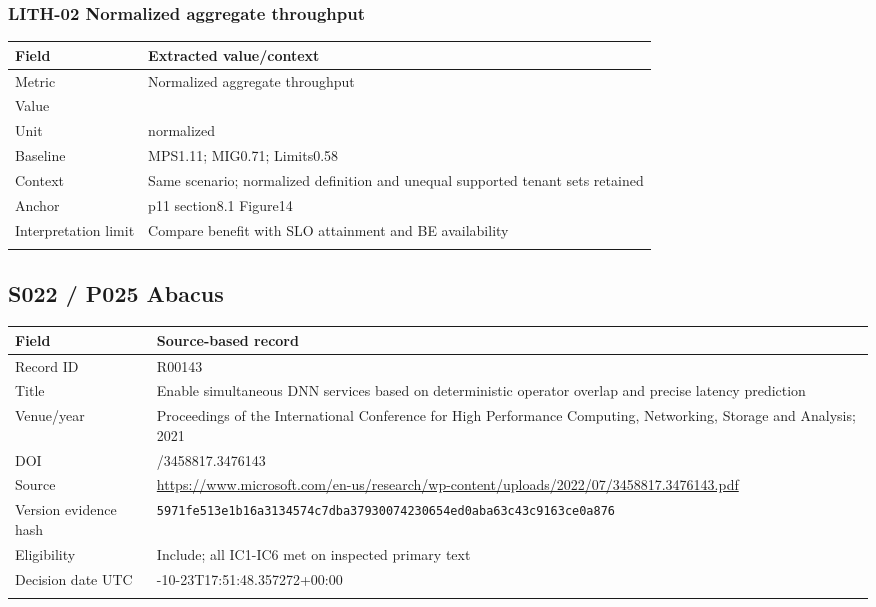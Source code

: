 \subsubsection*{LITH-02 Normalized aggregate throughput}
\begin{longtable}{>{\raggedright\arraybackslash}p{}>{\raggedright\arraybackslash}p{}}
\toprule
\textbf{Field} & \textbf{Extracted value/context}\\\midrule\endhead
Metric & Normalized aggregate throughput\\\addlinespace
Value & 1\\\addlinespace
Unit & normalized\\\addlinespace
Baseline & MPS1.11;\allowbreak{} MIG0.71;\allowbreak{} Limits0.58\\\addlinespace
Context & Same scenario;\allowbreak{} normalized definition and unequal supported tenant sets retained\\\addlinespace
Anchor & p11 section8.1 Figure14\\\addlinespace
Interpretation limit & Compare benefit with SLO attainment and BE availability\\\addlinespace
\bottomrule\end{longtable}
\clearpage\subsection{S022 / P025 Abacus}
\cite{s022}
\begin{longtable}{>{\raggedright\arraybackslash}p{}>{\raggedright\arraybackslash}p{}}
\toprule
\textbf{Field} & \textbf{Source-based record}\\\midrule\endhead
Record ID & R00143\\\addlinespace
Title & Enable simultaneous DNN services based on deterministic operator overlap and precise latency prediction\\\addlinespace
Venue/year & Proceedings of the International Conference for High Performance Computing,\allowbreak{} Networking,\allowbreak{} Storage and Analysis;\allowbreak{} 2021\\\addlinespace
DOI & 10.1145/3458817.3476143\\\addlinespace
Source & \url{https://www.microsoft.com/en-us/research/wp-content/uploads/2022/07/3458817.3476143.pdf}\\\addlinespace
Version evidence hash & \nolinkurl{5971fe513e1b16a3134574c7dba37930074230654ed0aba63c43c9163ce0a876}\\\addlinespace
Eligibility & Include;\allowbreak{} all IC1-IC6 met on inspected primary text\\\addlinespace
Decision date UTC & 2026-10-23T17:51:48.357272+00:00\\\addlinespace
\bottomrule\end{longtable}
